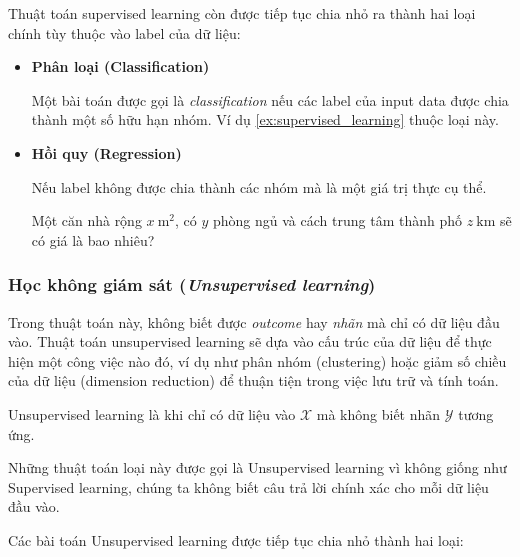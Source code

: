 \documentclass[../main-report.tex]{subfiles}
\begin{document}
Thuật toán supervised learning còn được tiếp tục chia nhỏ ra thành hai loại chính tùy thuộc vào label của dữ liệu:

\begin{itemize}
\item \textbf{Phân loại (Classification)}

Một bài toán được gọi là \emph{classification} nếu các label của input data được chia thành một số hữu hạn nhóm. Ví dụ \ref{ex:supervised_learning} thuộc loại này.

\item \textbf{Hồi quy (Regression)}

Nếu label không được chia thành các nhóm mà là một giá trị thực cụ thể.

\begin{example}
Một căn nhà rộng \(x ~ \text{m}^2\), có \(y\) phòng ngủ và cách trung tâm thành phố \(z~ \text{km}\) sẽ có giá là bao nhiêu?
\end{example}
\end{itemize}

\subsubsection{Học không giám sát (\emph{Unsupervised learning})}
Trong thuật toán này, không biết được \emph{outcome} hay \emph{nhãn} mà chỉ có dữ liệu đầu vào. Thuật toán unsupervised learning sẽ dựa vào cấu trúc của dữ liệu để thực hiện một công việc nào đó, ví dụ như phân nhóm (clustering) hoặc giảm số chiều của dữ liệu (dimension reduction) để thuận tiện trong việc lưu trữ và tính toán.

Unsupervised learning là khi chỉ có dữ liệu vào \(\mathcal{X} \) mà không biết nhãn \(\mathcal{Y}\) tương ứng.

Những thuật toán loại này được gọi là Unsupervised learning vì không giống như Supervised learning, chúng ta không biết câu trả lời chính xác cho mỗi dữ liệu đầu vào.

Các bài toán Unsupervised learning được tiếp tục chia nhỏ thành hai loại:
\end{document}
